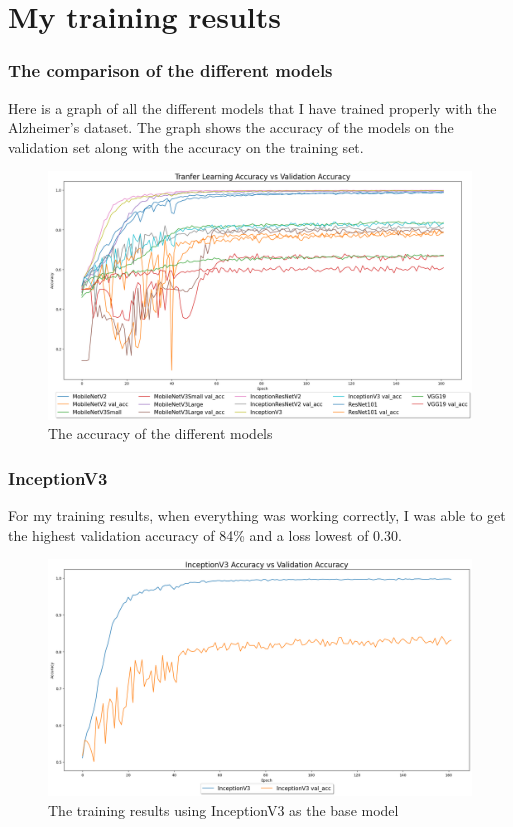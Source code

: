 \documentclass[]{final_report}
\begin{document}
\chapter{My training results}
\subsection{The comparison of the different models}
Here is a graph of all the different models that I have trained properly with the Alzheimer's dataset.
The graph shows the accuracy of the models on the validation set along with the accuracy on the training set.
\begin{figure}[h]
  \centering
  \includegraphics[width=1\textwidth]{images/good-training-acc-vs-val.png}
  \caption{The accuracy of the different models}
  \label{fig:loss}
\end{figure}
\pagebreak
\subsection{InceptionV3}
For my training results, when everything was working correctly, I was able to get the highest validation accuracy of 84\% and a loss lowest of 0.30.
\begin{figure}[ht!]
  \centering
  \includegraphics[width=120mm]{images/inceptionv3-accuracy-vs-val-acc.png}
  \caption{The training results using InceptionV3\cite{DBLP:journals/corr/SzegedyVISW15} as the base model}
\end{figure}
\end{document}
